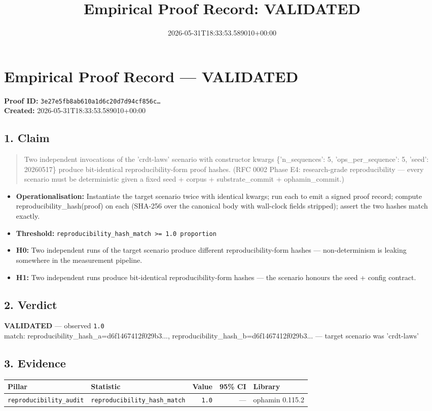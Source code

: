 \documentclass{article}
\title{Empirical Proof Record: VALIDATED}
\date{2026-05-31T18:33:53.589010+00:00}
\begin{document}
\maketitle
\section*{Empirical Proof Record --- \textcolor{validated}{\textbf{VALIDATED}}}
\textbf{Proof ID:} \texttt{3e27e5fb8ab610a1d6c20d7d94cf856c\dots}\\
\textbf{Created:} 2026-05-31T18:33:53.589010+00:00
\subsection*{1. Claim}
\begin{quote}Two independent invocations of the 'crdt-laws' scenario with constructor kwargs \{'n\_sequences': 5, 'ops\_per\_sequence': 5, 'seed': 20260517\} produce bit-identical reproducibility-form proof hashes. (RFC 0002 Phase E4: research-grade reproducibility — every scenario must be deterministic given a fixed seed + corpus + substrate\_commit + ophamin\_commit.)\end{quote}
\begin{itemize}
\item \textbf{Operationalisation:} Instantiate the target scenario twice with identical kwargs; run each to emit a signed proof record; compute reproducibility\_hash(proof) on each (SHA-256 over the canonical body with wall-clock fields stripped); assert the two hashes match exactly.
\item \textbf{Threshold:} \texttt{reproducibility\_hash\_match >= 1.0 proportion}
\item \textbf{H0:} Two independent runs of the target scenario produce different reproducibility-form hashes — non-determinism is leaking somewhere in the measurement pipeline.
\item \textbf{H1:} Two independent runs produce bit-identical reproducibility-form hashes — the scenario honours the seed + config contract.
\end{itemize}
\subsection*{2. Verdict}
\textcolor{validated}{\textbf{VALIDATED}} --- observed \texttt{1.0}\\
match: reproducibility\_hash\_a=d6f1467412f029b3..., reproducibility\_hash\_b=d6f1467412f029b3... — target scenario was 'crdt-laws'
\subsection*{3. Evidence}
\begin{tabular}{llrrl}\toprule
\textbf{Pillar} & \textbf{Statistic} & \textbf{Value} & \textbf{95\% CI} & \textbf{Library} \\\midrule
\texttt{reproducibility\_audit} & \texttt{reproducibility\_hash\_match} & \texttt{1.0} & --- & ophamin 0.115.2 \\
\bottomrule\end{tabular}
\end{document}
